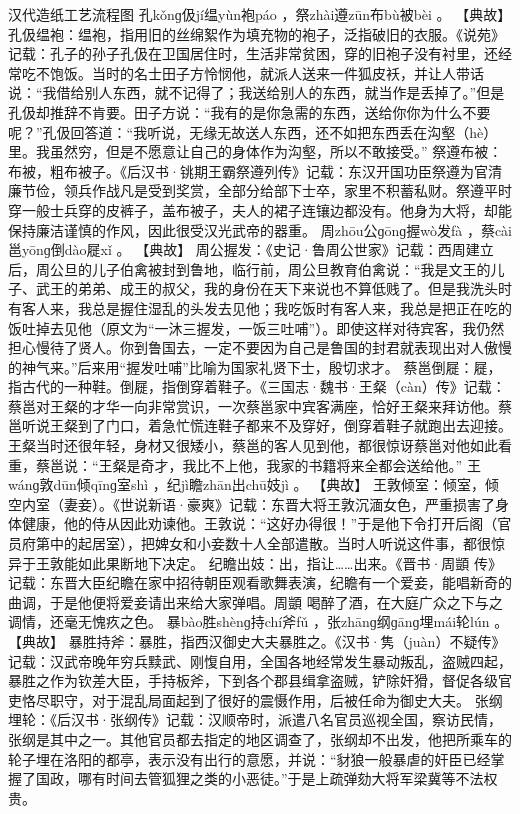 \documentclass[12pt,UTF8]{ctexbook}
\begin{document}
汉代造纸工艺流程图
孔kǒnɡ伋jí缊yùn袍páo
，祭zhài遵zūn布bù被bèi
。
【典故】
孔伋缊袍：缊袍，指用旧的丝绵絮作为填充物的袍子，泛指破旧的衣服。《说苑》记载：孔子的孙子孔伋在卫国居住时，生活非常贫困，穿的旧袍子没有衬里，还经常吃不饱饭。当时的名士田子方怜悯他，就派人送来一件狐皮袄，并让人带话说：“我借给别人东西，就不记得了；我送给别人的东西，就当作是丢掉了。”但是孔伋却推辞不肯要。田子方说：“我有的是你急需的东西，送给你你为什么不要呢？”孔伋回答道：“我听说，无缘无故送人东西，还不如把东西丢在沟壑（hè）里。我虽然穷，但是不愿意让自己的身体作为沟壑，所以不敢接受。”
祭遵布被：布被，粗布被子。《后汉书·铫期王霸祭遵列传》记载：东汉开国功臣祭遵为官清廉节俭，领兵作战凡是受到奖赏，全部分给部下士卒，家里不积蓄私财。祭遵平时穿一般士兵穿的皮裤子，盖布被子，夫人的裙子连镶边都没有。他身为大将，却能保持廉洁谨慎的作风，因此很受汉光武帝的器重。
周zhōu公ɡōnɡ握wò发fà
，蔡cài邕yōnɡ倒dào屣xǐ
。
【典故】
周公握发：《史记·鲁周公世家》记载：西周建立后，周公旦的儿子伯禽被封到鲁地，临行前，周公旦教育伯禽说：“我是文王的儿子、武王的弟弟、成王的叔父，我的身份在天下来说也不算低贱了。但是我洗头时有客人来，我总是握住湿乱的头发去见他；我吃饭时有客人来，我总是把正在吃的饭吐掉去见他（原文为“一沐三握发，一饭三吐哺”）。即使这样对待宾客，我仍然担心慢待了贤人。你到鲁国去，一定不要因为自己是鲁国的封君就表现出对人傲慢的神气来。”后来用“握发吐哺”比喻为国家礼贤下士，殷切求才。
蔡邕倒屣：屣，指古代的一种鞋。倒屣，指倒穿着鞋子。《三国志·魏书·王粲（càn）传》记载：蔡邕对王粲的才华一向非常赏识，一次蔡邕家中宾客满座，恰好王粲来拜访他。蔡邕听说王粲到了门口，着急忙慌连鞋子都来不及穿好，倒穿着鞋子就跑出去迎接。王粲当时还很年轻，身材又很矮小，蔡邕的客人见到他，都很惊讶蔡邕对他如此看重，蔡邕说：“王粲是奇才，我比不上他，我家的书籍将来全都会送给他。”
王wánɡ敦dūn倾qīnɡ室shì
，纪jì瞻zhān出chū妓jì
。
【典故】
王敦倾室：倾室，倾空内室（妻妾）。《世说新语·豪爽》记载：东晋大将王敦沉湎女色，严重损害了身体健康，他的侍从因此劝谏他。王敦说：“这好办得很！”于是他下令打开后阁（官员府第中的起居室），把婢女和小妾数十人全部遣散。当时人听说这件事，都很惊异于王敦能如此果断地下决定。
纪瞻出妓：出，指让……出来。《晋书·周顗 传》记载：东晋大臣纪瞻在家中招待朝臣观看歌舞表演，纪瞻有一个爱妾，能唱新奇的曲调，于是他便将爱妾请出来给大家弹唱。周顗
喝醉了酒，在大庭广众之下与之调情，还毫无愧疚之色。
暴bào胜shènɡ持chí斧fǔ
，张zhānɡ纲ɡānɡ埋mái轮lún
。
【典故】
暴胜持斧：暴胜，指西汉御史大夫暴胜之。《汉书·隽（juàn）不疑传》记载：汉武帝晚年穷兵黩武、刚愎自用，全国各地经常发生暴动叛乱，盗贼四起，暴胜之作为钦差大臣，手持板斧，下到各个郡县缉拿盗贼，铲除奸猾，督促各级官吏恪尽职守，对于混乱局面起到了很好的震慑作用，后被任命为御史大夫。
张纲埋轮：《后汉书·张纲传》记载：汉顺帝时，派遣八名官员巡视全国，察访民情，张纲是其中之一。其他官员都去指定的地区调查了，张纲却不出发，他把所乘车的轮子埋在洛阳的都亭，表示没有出行的意愿，并说：“豺狼一般暴虐的奸臣已经掌握了国政，哪有时间去管狐狸之类的小恶徒。”于是上疏弹劾大将军梁冀等不法权贵。
\end{document}
